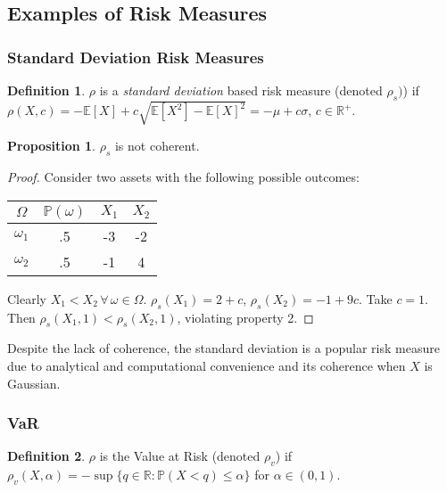 \documentclass[12pt]{article}
\theoremstyle{definition}
\newtheorem{riskmeasure}{Definition}
\newtheorem{prop}{Proposition}
\begin{document}
\subsection{Examples of Risk Measures}


\subsubsection{Standard Deviation Risk Measures}
\begin{riskmeasure}
\(\rho\) is a \emph{standard deviation}  based risk measure (denoted \(\rho_s)\)) if \(\rho(X, c)=-\mathbb{E}[X]+c\sqrt{\mathbb{E}[X^2]-\mathbb{E}[X]^2}=-\mu+ c \sigma,\,c\in \mathbb{R}^+\).
\end{riskmeasure}

\begin{prop}
\(\rho_s\) is not coherent.
\end{prop}

\begin{proof}
Consider two assets with the following possible outcomes:
\begin{center}
\begin{tabular}{ c| c c c }
  \(\Omega\) & \(\mathbb{P}(\omega)\) & \(X_1\) & \(X_2\) \\
  \hline
  \(\omega_1\)  &.5 & -3 & -2 \\
  \(\omega_2\)  & .5 & -1 & 4 \\
\end{tabular}
\end{center}

Clearly \(X_1 < X_2 \,\forall \, \omega \in \Omega\).  \(\rho_s(X_1)=2+c\), \(\rho_s(X_2)=-1+9c\).  Take \(c=1\).  Then \(\rho_s(X_1, 1)<\rho_s(X_2, 1)\), violating property 2.  

\end{proof}

Despite the lack of coherence, the standard deviation is a popular risk measure due to analytical and computational convenience and its coherence when \(X\) is Gaussian.  

\subsubsection{VaR}

\begin{riskmeasure}
\(\rho\) is the Value at Risk (denoted \(\rho_v\)) if  \(\rho_v(X, \alpha)=-\sup{ \{q \in \mathbb{R}:\mathbb{P}(X< q) \leq \alpha\} }\) for \(\alpha \in (0, 1)\).\end{riskmeasure}
\end{document}
